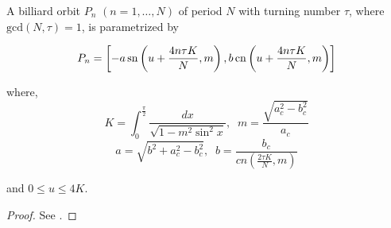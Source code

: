 
\begin{theorem}
A billiard orbit $P_n$ $(n=1,\ldots, N) $ of period $N$  with turning number $\tau$, where $\mathrm{gcd}(N,\tau) =1$,  is parametrized by

\[ 
P_n=
\left[-a\,\mathrm{sn}  \left(u+\frac{4n\tau K}{N}, m \right) , b\,\mathrm{cn}  \left(u+\frac{4n\tau K}{N}, m \right)\right]
\]
 
where,
\[ K=\int_{0}^{\frac{\pi}{2}} \frac {dx}{\sqrt {1-m^{2}   \sin^2 x  
}},\;\; m=\frac{\sqrt{a_c^2-b_c^2}}{a_c}  \]
\[a= \sqrt{b^2+ a_c^2-b_c^2}, \;\; b=\frac{b_c}{cn(\frac{2\tau K}{N}, m)}\]

and $0\leq u\leq 4K.$
\end{theorem}

\begin{proof} See \cite{stachel2021-billiards-param}.

\end{proof}

